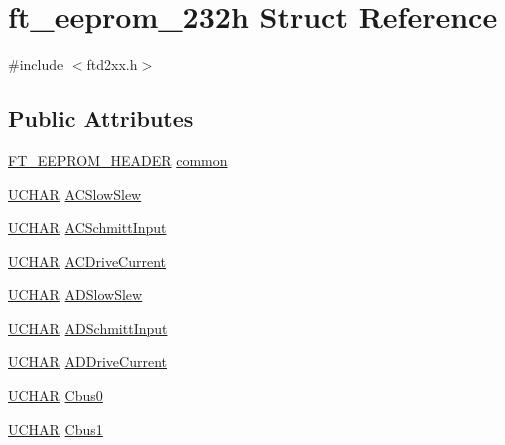 \hypertarget{structft__eeprom__232h}{
\section{ft\_\-eeprom\_\-232h Struct Reference}
\label{structft__eeprom__232h}
}


{\ttfamily \#include $<$ftd2xx.h$>$}\subsection*{Public Attributes}
\begin{DoxyCompactItemize}
\item 
\hyperlink{structft__eeprom__header}{FT\_\-EEPROM\_\-HEADER} \hyperlink{structft__eeprom__232h_a37234d2dd02343759c92fd97e4835ccb}{common}
\item 
\hyperlink{LALUsbx64_2include_2WinTypes_8h_a4f4bb67531a9bf6f0b9c6ad76aeba587}{UCHAR} \hyperlink{structft__eeprom__232h_a3cfbbe62de0029839534fb469a9b50c9}{ACSlowSlew}
\item 
\hyperlink{LALUsbx64_2include_2WinTypes_8h_a4f4bb67531a9bf6f0b9c6ad76aeba587}{UCHAR} \hyperlink{structft__eeprom__232h_a025e35a0ae019370a4ea968f1cc2df2b}{ACSchmittInput}
\item 
\hyperlink{LALUsbx64_2include_2WinTypes_8h_a4f4bb67531a9bf6f0b9c6ad76aeba587}{UCHAR} \hyperlink{structft__eeprom__232h_a8cb3fbf23ced09e59165178aee3f3c57}{ACDriveCurrent}
\item 
\hyperlink{LALUsbx64_2include_2WinTypes_8h_a4f4bb67531a9bf6f0b9c6ad76aeba587}{UCHAR} \hyperlink{structft__eeprom__232h_a192cf979058aac20dbea8840a35f1bae}{ADSlowSlew}
\item 
\hyperlink{LALUsbx64_2include_2WinTypes_8h_a4f4bb67531a9bf6f0b9c6ad76aeba587}{UCHAR} \hyperlink{structft__eeprom__232h_a9d6cc1ae3e56bad64ba55a3db9cd845c}{ADSchmittInput}
\item 
\hyperlink{LALUsbx64_2include_2WinTypes_8h_a4f4bb67531a9bf6f0b9c6ad76aeba587}{UCHAR} \hyperlink{structft__eeprom__232h_a6aa2aea692700ed5e98a958819db3944}{ADDriveCurrent}
\item 
\hyperlink{LALUsbx64_2include_2WinTypes_8h_a4f4bb67531a9bf6f0b9c6ad76aeba587}{UCHAR} \hyperlink{structft__eeprom__232h_aac7c9328aa4b74813b1fbd73a0a6afbd}{Cbus0}
\item 
\hyperlink{LALUsbx64_2include_2WinTypes_8h_a4f4bb67531a9bf6f0b9c6ad76aeba587}{UCHAR} \hyperlink{structft__eeprom__232h_ac56f116aab26598caa87cc9ac28376af}{Cbus1}
\item 

\end{DoxyCompactItemize}
